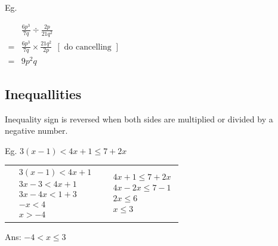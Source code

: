 \documentclass[twocolumn]{article}
\begin{document}
\noindent 
Eg. 

\noindent 
$\begin{aligned} & \frac{6 p^3}{7 q} \div \frac{2 p}{21 q^2} \\ = & \frac{6 p^3}{7 q} \times \frac{21 q^2}{2 p} \ \ [\text { do cancelling }] \\ = & 9 p^2 q\end{aligned}$

\subsection*{Inequallities}

\noindent 
Inequality sign is reversed when both sides are multiplied or divided by a negative number.

\bigskip 

\noindent 
Eg. $3(x-1)<4 x+1 \leq 7+2 x$

\bigskip 
\begin{tabular}{c|c} 
$
\begin{aligned}
	& 3(x-1)<4 x+1 \\
	& 3 x-3<4 x+1 \\
	& 3 x-4 x<1+3 \\
	& -x<4 \\
	& x>-4
\end{aligned}
$
& 
$
\begin{aligned}
	& 4 x+1 \leq 7+2 x \\
	& 4 x-2 x \leq 7-1 \\
	& 2 x \leq 6 \\
	& x \leq 3
\end{aligned}
$
\end{tabular} 

\bigskip 

\noindent 
Ans: $-4 < x \leq 3$
\end{document}
